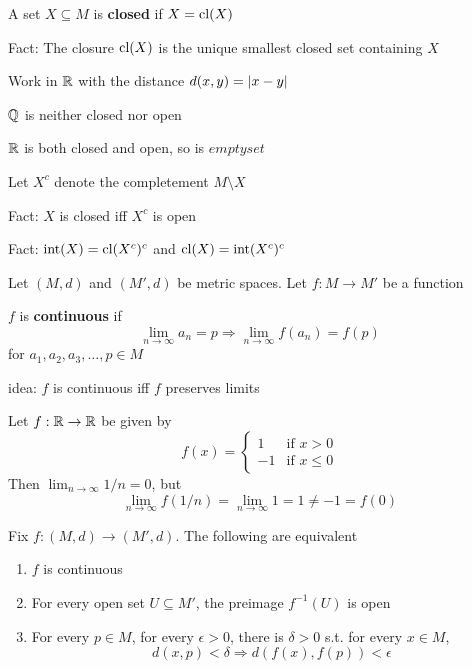 \documentclass[11pt]{article}
\def \tint {\text{int}}
\begin{document}
\begin{definition}[]
A set \(X\subseteq M\) is \textbf{closed} if \(X=\operatorname{\text{cl}}(X)\)
\end{definition}


Fact: The closure \(\operatorname{\text{cl}}(X)\) is the unique smallest closed set containing \(X\)

\begin{examplle}[]
Work in \(\mathbb{R}\) with the distance \(d(x,y)=\abs{x-y}\)

\(\mathbb{Q}\) is neither closed nor open

\(\mathbb{R}\) is both closed and open, so is \(emptyset\)
\end{examplle}

Let \(X^c\) denote the completement \(M\setminus X\)

Fact: \(X\) is closed iff \(X^c\) is open

Fact: \(\tint(X)=\cl(X^c)^c\) and \(\cl(X)=\tint(X^c)^c\)

Let \((M,d)\) and \((M',d)\) be metric spaces. Let \(f:M\to M'\) be a function
\begin{definition}[]
\(f\) is \textbf{continuous} if
\begin{equation*}
\lim_{n\to\infty}a_n=p\Rightarrow\lim_{n\to\infty}f(a_n)=f(p)
\end{equation*}
for \(a_1,a_2,a_3,\dots,p\in M\)
\end{definition}

idea: \(f\) is continuous iff \(f\) preserves limits

\begin{examplle}[]
Let \(f:\mathbb{R}\to\mathbb{R}\) be given by
\begin{equation*}
f(x)=
\begin{cases}
1&\text{if }x>0\\
-1&\text{if }x\le 0
\end{cases}
\end{equation*}
Then \(\lim_{n\to\infty}1/n=0\), but
\begin{equation*}
\lim_{n\to\infty}f(1/n)=\lim_{n\to\infty}1=1\neq-1=f(0)
\end{equation*}
\end{examplle}

\begin{proposition}[]
Fix \(f:(M,d)\to(M',d)\). The following are equivalent
\begin{enumerate}
\item \(f\) is continuous
\item For every open set \(U\subseteq M'\), the preimage \(f^{-1}(U)\) is open
\item For every \(p\in M\), for every \(\epsilon>0\), there is \(\delta>0\) s.t. for every \(x\in M\),
 \begin{equation*}
d(x,p)<\delta\Rightarrow d(f(x),f(p))<\epsilon
 \end{equation*}
\end{enumerate}
\end{proposition}
\end{document}
